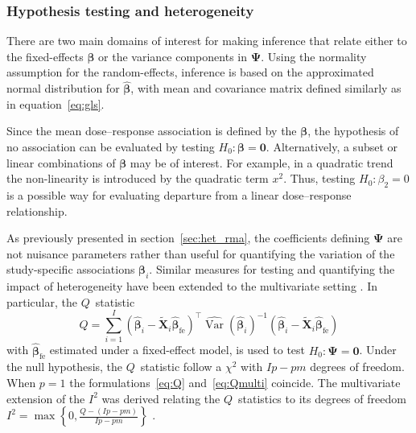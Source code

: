 \documentclass[11pt,a4paper,twoside,openany]{book}\usepackage{knitr}
\DeclareMathOperator{\Var}{Var}
\begin{document}
{\subsubsection*{Hypothesis testing and heterogeneity}

There are two main domains of interest for making inference that relate either to the fixed-effects $\boldsymbol{\beta}$ or the variance components in $\boldsymbol{\Psi}$. Using the normality assumption for the random-effects, inference is based on the approximated normal distribution for $\boldsymbol{\hat \beta}$, with mean and covariance matrix defined similarly as in equation~\ref{eq:gls}.

\noindent Since the mean dose--response association is defined by the $\boldsymbol \beta$, the hypothesis of no association can be evaluated by testing $H_0: \boldsymbol{\beta} = \boldsymbol{0}$. 
Alternatively, a subset or linear combinations of $\boldsymbol \beta$ may be of interest. For example, in a quadratic trend the non-linearity is introduced by the quadratic term $x^2$. Thus, testing $H_0: \beta_2 = 0$ is a possible way for evaluating departure from a linear dose--response relationship.

As previously presented in section~\ref{sec:het_rma}, the coefficients defining $\boldsymbol{\Psi}$ are not nuisance parameters rather than useful for quantifying the variation of the study-specific associations $\boldsymbol{\beta}_i$. Similar measures for testing and quantifying the impact of heterogeneity have been extended to the multivariate setting \citep{berkey1996multiple}. In particular, the $Q$~statistic
\begin{equation}
Q = \sum_{i=1}^I \left(\boldsymbol{\hat \beta}_i - \widetilde{\mathbf{X}}_i\boldsymbol{\hat \beta}_{\text{fe}}\right) ^\top \widehat{\Var} \left( \boldsymbol{\hat \beta}_i \right)^{-1} \left(\boldsymbol{\hat \beta}_i - \widetilde{\mathbf{X}}_i\boldsymbol{\hat \beta}_{\text{fe}}\right)
\label{eq:Qmulti}
\end{equation}
\noindent with $\boldsymbol{\hat \beta}_{\text{fe}}$ estimated under a fixed-effect model, is used to test $H_0: \boldsymbol{\Psi} = \boldsymbol{0}$. Under the null hypothesis, the $Q$~statistic follow a $\chi^2$ with $Ip - pm$ degrees of freedom. When $p = 1$ the formulations~\ref{eq:Q} and~\ref{eq:Qmulti} coincide. The multivariate extension of the $I^2$ was derived relating the $Q$~statistics to its degrees of freedom $I^2 = \max \left\{0, \frac{Q- (Ip - pm)}{Ip - pm}\right\}$ \citep{jackson2012quantifying}.

}
\end{document}
